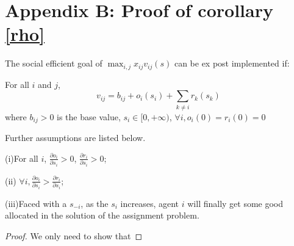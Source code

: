 
\chapter{Appendix B: Proof of corollary \ref{rho}} %

\label{Appendix_B} %
\begin{corollary*}
  The social efficient goal of $\max_{i,j}x_{ij}v_{ij}(s)$ can be ex post implemented if:
  
For all $i$ and $j$,
$$v_{ij}=b_{ij} + o_i(s_i) + \sum_{k \not = i} r_k(s_k) $$
where $b_{ij}>0$ is the base value, $s_i \in [0, + \infty)$, $\forall i,o_i(0)=r_i(0)=0$

Further assumptions are listed below.

(i)For all $i$, $\frac{\partial o_i}{\partial s_i} > 0$, $\frac{\partial r_i}{\partial s_i} > 0$;

(ii) $\forall i, \frac{\partial o_i}{\partial s_i}
> \frac{\partial r_i}{\partial s_i}$;

(iii)Faced with a $s_{-i}$, as the $s_i$ increases, agent $i$ will finally get some good allocated in the solution of the assignment problem.
\end{corollary*}

\begin{proof}
 We only need to show that
 
\end{proof}